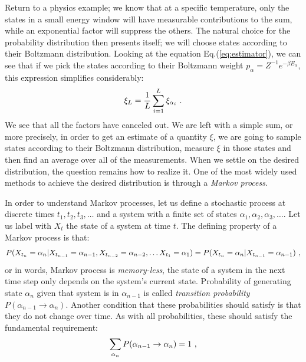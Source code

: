 \par
Return to a physics example; we know that at a specific temperature, only the states in a small energy window will have measurable contributions to the sum, while an exponential factor will suppress the others. The natural choice for the probability distribution then presents itself; we will choose states according to their Boltzmann distribution. Looking at the equation Eq.(\ref{eq:estimator}), we can see that if we pick the states according to their Boltzmann weight $p_\alpha = Z^{-1} e^{-\beta E_\alpha}$, this expression simplifies considerably:
\begin{equation}
	\xi_L = \frac{1}{L} \sum_{i=1}^{L}\xi_{\alpha_i} \ .
	\label{eq:mcestimation}
\end{equation}
We see that all the factors have canceled out. We are left with a simple sum, or more precisely, in order to get an estimate of a quantity $\xi$, we are going to sample states according to their Boltzmann distribution, measure $\xi$ in those states and then find an average over all of the measurements. When we settle on the desired distribution, the question remains how to realize it. One of the most widely used methods to achieve the desired distribution is through a \textit{Markov process}.
\par
In order to understand Markov processes, let us define a stochastic process at discrete times $t_1, t_2, t_3, \dots$ and a system with a finite set of states $\alpha_1, \alpha_2, \alpha_3, \dots$. Let us label with $X_t$ the state of a system at time $t$. The defining property of a Markov process is that:
\begin{equation}
	P(X_{t_n} = \alpha_{n} | X_{t_{n-1}} = \alpha_{n-1}, X_{t_{n-2}} = \alpha_{n-2}, \dots X_{t_{1}} = \alpha_{1}) = P(X_{t_n} = \alpha_{n} | X_{t_{n-1}} = \alpha_{n-1}) \ ,
\end{equation}
or in words, Markov process is \textit{memory-less}, the state of a system in the next time step only depends on the system's current state. Probability of generating state $\alpha_n$ given that system is in $\alpha_{n-1}$ is called \textit{transition probability} $P(\alpha_{n-1} \rightarrow \alpha_n)$. Another condition that these probabilities should satisfy is that they do not change over time. As with all probabilities, these should satisfy the fundamental requirement:
\begin{equation}
	\sum_{\alpha_n}P(\alpha_{n-1} \rightarrow \alpha_n) = 1 \ ,
	\label{eq:sumtoone}
\end{equation}

